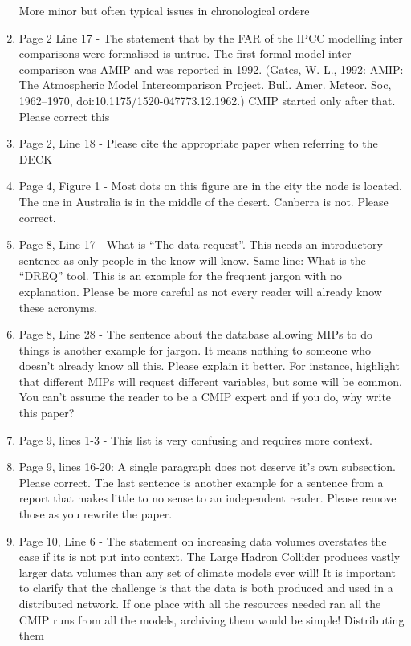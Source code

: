 \documentclass[gmd,manuscript]{copernicus}
\begin{document}
\begin{enumerate}[label=RC3-\arabic*,leftmargin=*]
  More minor but often typical issues in chronological ordere
\item Page 2 Line 17 - The statement that by the FAR of the IPCC
  modelling inter comparisons were formalised is untrue. The first
  formal model inter comparison was AMIP and was reported in 1992.
  (Gates, W. L., 1992: AMIP: The Atmospheric Model Intercomparison
  Project. Bull. Amer. Meteor. Soc, 1962–1970,
  doi:10.1175/1520-047773.12.1962.) CMIP started only after that.
  Please correct this
\item Page 2, Line 18 - Please cite the appropriate paper when
  referring to the DECK
\item Page 4, Figure 1 - Most dots on this figure are in the city the
  node is located. The one in Australia is in the middle of the
  desert. Canberra is not. Please correct.
\item Page 8, Line 17 - What is “The data request”. This needs an
  introductory sentence as only people in the know will know. Same
  line: What is the “DREQ” tool. This is an example for the frequent
  jargon with no explanation. Please be more careful as not every
  reader will already know these acronyms.
\item Page 8, Line 28 - The sentence about the database allowing MIPs
  to do things is another example for jargon. It means nothing to
  someone who doesn’t already know all this. Please explain it better.
  For instance, highlight that different MIPs will request different
  variables, but some will be common. You can’t assume the reader to
  be a CMIP expert and if you do, why write this paper?
\item Page 9, lines 1-3 - This list is very confusing and requires
  more context.
\item Page 9, lines 16-20: A single paragraph does not deserve it’s own
  subsection. Please correct. The last sentence is another example for
  a sentence from a report that makes little to no sense to an
  independent reader. Please remove those as you rewrite the paper.
\item Page 10, Line 6 - The statement on increasing data volumes
  overstates the case if its is not put into context. The Large Hadron
  Collider produces vastly larger data volumes than any set of climate
  models ever will! It is important to clarify that the challenge is
  that the data is both produced and used in a distributed network. If
  one place with all the resources needed ran all the CMIP runs from
  all the models, archiving them would be simple! Distributing them

\end{enumerate}
\end{document}
